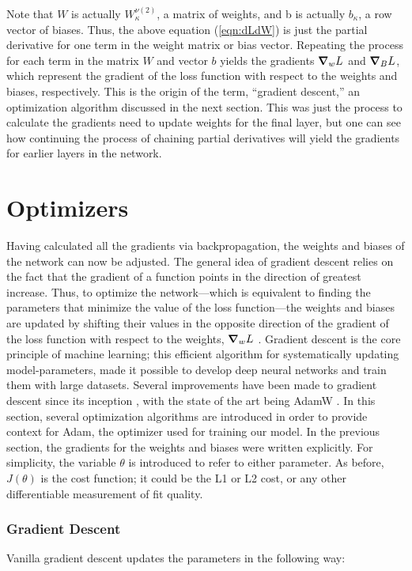 Note that $ W $ is actually $ W_\kappa ^{\nu (2)} $, a matrix of weights, and b is actually $ b_\kappa $, a row vector of biases. Thus, the above equation (\ref{eqn:dLdW}) is just the partial derivative for one term in the weight matrix or bias vector. Repeating the process for each term in the matrix $ W $  and vector $ b $  yields the gradients $ \grad_w L $  and $ \grad_B L $, which represent the gradient of the loss function with respect to the weights and biases, respectively. This is the origin of the term, ``gradient descent,'' an optimization algorithm discussed in the next section. This was just the process to calculate the gradients need to update weights for the final layer, but one can see how continuing the process of chaining partial derivatives will yield the gradients for earlier layers in the network.

\section{Optimizers}
Having calculated all the gradients via backpropagation, the weights and biases of the network can now be adjusted. The general idea of gradient descent relies on the fact that the gradient of a function points in the direction of greatest increase. Thus, to optimize the network---which is equivalent to finding the parameters that minimize the value of the loss function---the weights and biases are updated by shifting their values in the opposite direction of the gradient of the loss function with respect to the weights, $ \grad_w L $ . Gradient descent is the core principle of machine learning; this efficient algorithm for systematically updating model-parameters, made it possible to develop deep neural networks and train them with large datasets. Several improvements have been made to gradient descent since its inception \cite{cauchy-orig-grad-descent}, with the state of the art being AdamW \cite{AdamW-orig}. In this section, several optimization algorithms are introduced in order to provide context for Adam, the optimizer used for training our model. In the previous section, the gradients for the weights and biases were written explicitly. For simplicity, the variable $ \theta $ is introduced to refer to either parameter. As before, $ J(\theta) $  is the cost function; it could be the L1 or L2 cost, or any other differentiable measurement of fit quality.

\subsubsection{Gradient Descent}
Vanilla gradient descent \cite{gradient-descent-rev-article} updates the parameters in the following way:

